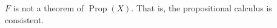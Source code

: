 $F$ is not a theorem of $\operatorname{Prop}(X)$. That is, the propositional calculus is consistent.
